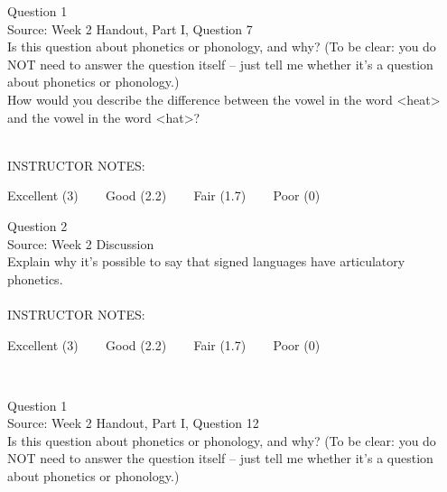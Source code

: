\documentclass[12pt]{article}
\begin{document}
{\large Question 1}\\

Source: Week 2 Handout, Part I, Question 7\\

Is this question about phonetics or phonology, and why? (To be clear: you do NOT need to answer the question itself -- just tell me whether it's a question about phonetics or phonology.)\\

How would you describe the difference between the vowel in the word <heat> and the vowel in the word <hat>?


~\\
INSTRUCTOR NOTES: 


\vfill
Excellent (3) ~~~ Good (2.2) ~~~ Fair (1.7) ~~~ Poor (0)
\newpage

{\large Question 2}\\

Source: Week 2 Discussion\\

Explain why it's possible to say that signed languages have articulatory phonetics.\\


~\\
INSTRUCTOR NOTES: 


\vfill
Excellent (3) ~~~ Good (2.2) ~~~ Fair (1.7) ~~~ Poor (0)
\newpage

\begin{center}
\textbf{{\color{red}{\HUGE END OF EXAM}}}\\

\end{center}
\newpage

\begin{center}
\textbf{{\color{blue}{\HUGE START OF EXAM\\}}}

\textbf{{\color{blue}{\HUGE Student ID: 11196\\}}}

\textbf{{\color{blue}{\HUGE 4:30\\}}}

\end{center}
\newpage

{\large Question 1}\\

Source: Week 2 Handout, Part I, Question 12\\

Is this question about phonetics or phonology, and why? (To be clear: you do NOT need to answer the question itself -- just tell me whether it's a question about phonetics or phonology.)\\
\end{document}

